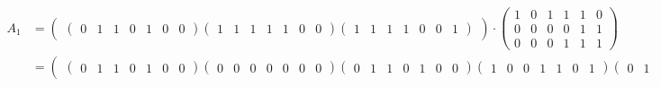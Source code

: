 \begin{equation}\label{eq:ej-A-1}
	\begin{aligned}
	{A_1} & = 
		\left(\begin{matrix}
			\left(\begin{smallmatrix}
				0 & 1 & 1 & 0 & 1 & 0 & 0
			\end{smallmatrix}\right)
	
			\left(\begin{smallmatrix}
				1 & 1 & 1 & 1 & 1 & 0 & 0
			\end{smallmatrix}\right)
		
			\left(\begin{smallmatrix}
				1 & 1 & 1 & 1 & 0 & 0 & 1
			\end{smallmatrix}\right)
		\end{matrix}\right)
		\cdot
		\left(\begin{smallmatrix}
			1 & 0 & 1 & 1 & 1 & 0\\
			0 & 0 & 0 & 0 & 1 & 1\\
			0 & 0 & 0 & 1 & 1 & 1
		\end{smallmatrix}\right)\\
		& = \left(\begin{matrix}
				\left(\begin{smallmatrix}
					0 & 1 & 1 & 0 & 1 & 0 & 0
				\end{smallmatrix}\right)
		
				\left(\begin{smallmatrix}
					0 & 0 & 0 & 0 & 0 & 0 & 0
				\end{smallmatrix}\right)
		
				\left(\begin{smallmatrix}
					0 & 1 & 1 & 0 & 1 & 0 & 0
				\end{smallmatrix}\right)
			
				\left(\begin{smallmatrix}
					1 & 0 & 0 & 1 & 1 & 0 & 1
				\end{smallmatrix}\right)
				\left(\begin{smallmatrix}
					0 & 1 & 1 & 0 & 0 & 0 & 1
				\end{smallmatrix}\right)
				\left(\begin{smallmatrix}
					0 & 0 & 0 & 0 & 1 & 0 & 1
				\end{smallmatrix}\right)
			\end{matrix}\right)
	\end{aligned}
\end{equation}

